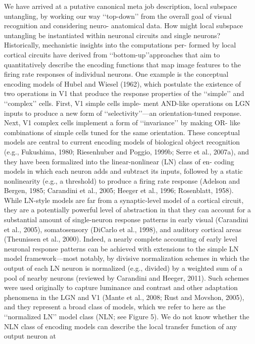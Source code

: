 We have arrived at a putative canonical meta job description,
local subspace untangling, by working our way ‘‘top-down’’
from the overall goal of visual recognition and considering neuro-
anatomical data. How might local subspace untangling be
instantiated within neuronal circuits and single neurons?
Historically, mechanistic insights into the computations per-
formed by local cortical circuits have derived from ‘‘bottom-up’’approaches that aim to quantitatively describe the encoding
functions that map image features to the firing rate responses
of individual neurons. One example is the conceptual encoding
models of Hubel and Wiesel (1962), which postulate the existence
of two operations in V1 that produce the response properties of
the ‘‘simple’’ and ‘‘complex’’ cells. First, V1 simple cells imple-
ment AND-like operations on LGN inputs to produce a new
form of ‘‘selectivity’’—an orientation-tuned response. Next, V1
complex cells implement a form of ‘‘invariance’’ by making OR-
like combinations of simple cells tuned for the same orientation.
These conceptual models are central to current encoding
models of biological object recognition (e.g., Fukushima, 1980;
Riesenhuber and Poggio, 1999b; Serre et al., 2007a), and they
have been formalized into the linear-nonlinear (LN) class of en-
coding models in which each neuron adds and subtract its inputs,
followed by a static nonlinearity (e.g., a threshold) to produce
a firing rate response (Adelson and Bergen, 1985; Carandini
et al., 2005; Heeger et al., 1996; Rosenblatt, 1958). While LN-style
models are far from a synaptic-level model of a cortical circuit,
they are a potentially powerful level of abstraction in that they
can account for a substantial amount of single-neuron response
patterns in early visual (Carandini et al., 2005), somatosensory
(DiCarlo et al., 1998), and auditory cortical areas (Theunissen
et al., 2000). Indeed, a nearly complete accounting of early level
neuronal response patterns can be achieved with extensions to
the simple LN model framework—most notably, by divisive
normalization schemes in which the output of each LN neuron
is normalized (e.g., divided) by a weighted sum of a pool of nearby
neurons (reviewed by Carandini and Heeger, 2011). Such
schemes were used originally to capture luminance and contrast
and other adaptation phenomena in the LGN and V1 (Mante et al.,
2008; Rust and Movshon, 2005), and they represent a broad class
of models, which we refer to here as the ‘‘normalized LN’’ model
class (NLN; see Figure 5).
We do not know whether the NLN class of encoding models
can describe the local transfer function of any output neuron at
